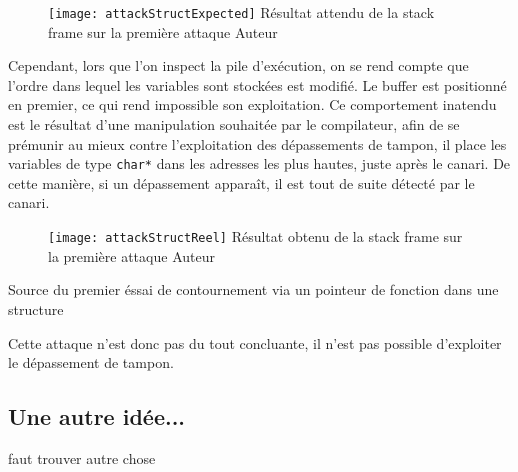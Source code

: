 \begin{figure}[H]
	\centering
	\texttt{[image: attackStructExpected]}
	{Résultat attendu de la \og stack frame \fg sur la première attaque}
	{Auteur}
	\label{fig:attackStructExpected}
\end{figure}

Cependant, lors que l'on inspect la pile d'exécution, on se rend compte que l'ordre dans lequel les variables sont stockées est modifié. Le \og buffer \fg est positionné en premier, ce qui rend impossible son exploitation. Ce comportement inatendu est le résultat d'une manipulation souhaitée par le compilateur, afin de se prémunir au mieux contre l'exploitation des dépassements de tampon, il place les variables de type \texttt{char*} dans les adresses les plus hautes, juste après le canari. De cette manière, si un dépassement apparaît, il est tout de suite détecté par le canari.

\begin{figure}[H]
	\centering
	\texttt{[image: attackStructReel]}
	{Résultat obtenu de la \og stack frame \fg sur la première attaque}
	{Auteur}
	\label{fig:attackStructReel}
\end{figure}

\begin{listing}
	\caption{Source du premier éssai de contournement via un pointeur de fonction dans une structure}
	\label{lst:struct}
\end{listing}

Cette attaque n'est donc pas du tout concluante, il n'est pas possible d'exploiter le dépassement de tampon.

\subsection{Une autre idée...}
faut trouver autre chose

